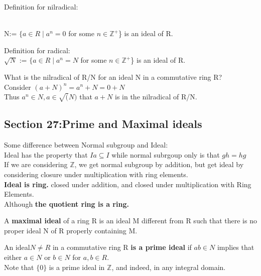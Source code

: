\documentclass{article}
\newcommand\Z{\ensuremath{\mathbb{Z}}}
\begin{document}
\begin{Example}
    Definition for nilradical:

 \\ N:= $\{ a \in R \mid a^n = 0$ for some $n \in \Z^+$\} is an ideal of R.
\end{Example}

\begin{Example}
    Definition for radical:
     \\ $\sqrt{N}$ := $\{ a \in R \mid a^n = N$ for some $n \in \Z^+$\} is an ideal of R.
\end{Example}

\begin{Example}
    What is the nilradical of R/N for an ideal N in a commutative ring R? 
    \\ Consider $(a+N)^n = a^n +N = 0 + N$
    \\Thus $a^n \in N, a\in \sqrt(N)$ that $a+N$ is in the nilradical of R/N.
\end{Example}

\newpage







\subsection{Section 27:Prime and Maximal ideals}
\begin{note}
    Some difference between Normal subgroup and Ideal:
    \\Ideal has the property that $Ia \subseteq I$ while normal subrgoup only is that $gh = hg$
    \\If we are considering $\Z$, we get normal subgroup by addition, but get ideal by considering closure under multiplication with ring elements. 
    \\\textbf{Ideal is ring.} closed under addition, and closed under multiplication with Ring Elements.
    \\Although \textbf{the quotient ring is a ring.}
\end{note}

\begin{Def}
    A \textbf{maximal ideal} of a ring R is an ideal M different from R such that there is no proper ideal N of R properly containing M.
\end{Def}
\begin{Def}
    An ideal$ N \neq R $ in a commutative ring R \textbf{is a prime ideal} if $ab \in N$ implies that either $a\in N $ or $b \in N$ for $a,b\in R$.
    \\Note that $\{0\}$ is a prime ideal in $\Z$, and indeed, in any integral domain. 
\end{Def}
\end{document}
